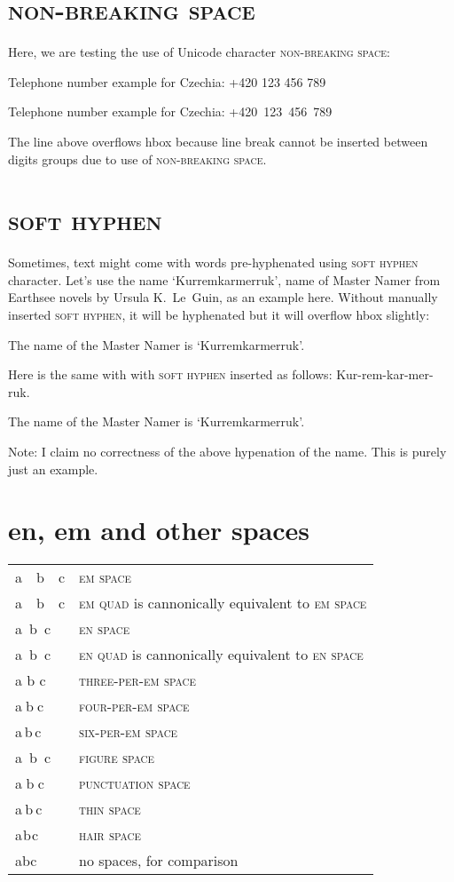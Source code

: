 \documentclass{article}
\DeclareRobustCommand{\expl}[1]{{\sffamily #1}}
\newcommand{\nbsp}{\textsc{non-breaking space}}
\newcommand{\shy}{\textsc{soft hyphen}}
\newcommand{\enquad}{\textsc{en quad}}
\newcommand{\enspaceC}{\textsc{en space}}
\newcommand{\emquad}{\textsc{em quad}}
\newcommand{\emspaceC}{\textsc{em space}}
\newcommand{\threePerEm}{\textsc{three-per-em space}}
\newcommand{\fourPerEm}{\textsc{four-per-em space}}
\newcommand{\sixPerEm}{\textsc{six-per-em space}}
\newcommand{\figuresp}{\textsc{figure space}}
\newcommand{\punctsp}{\textsc{punctuation space}}
\newcommand{\thinsp}{\textsc{thin space}}
\newcommand{\hairsp}{\textsc{hair space}}
\begin{document}
\pagebreak

\section{\nbsp{}}

\expl{Here, we are testing the use of Unicode character \nbsp{}:}

Telephone number example for Czechia: +420 123 456 789

Telephone number example for Czechia: +420 123 456 789

\expl{The line above overflows hbox because line break cannot be inserted
  between digits groups due to use of \nbsp{}.}

\pagebreak

\section{\shy{}}
\expl{Sometimes, text might come with words pre-​hyphenated using \shy{}
  character. Let's use the name `Kurremkarmerruk', name of Master Namer from
  Earthsee novels by Ursula K.\ Le~Guin, as an example here. Without manually
  inserted \shy{}, it will be hyphenated but it will overflow hbox slightly:}

The name of the Master Namer is `Kurremkarmerruk'.

\expl{Here is the same with with \shy{} inserted as follows:
  Kur-rem-kar-mer-ruk.}

The name of the Master Namer is `Kur­rem­kar­mer­ruk'.

\expl{Note: I claim no correctness of the above hypenation of the name. This
  is purely just an example.}

\pagebreak

\section{en, em and other spaces}

\begin{tabular}[c]{l | p{}}
  a b c & \expl{\emspaceC{}}\tabularnewline
  a b c & \expl{\emquad{} is cannonically equivalent to \emspaceC{}}\tabularnewline
  a b c & \expl{\enspaceC{}}\tabularnewline
  a b c & \expl{\enquad{} is cannonically equivalent to \enspaceC{}}\tabularnewline
  a b c & \expl{\threePerEm{}}\tabularnewline
  a b c & \expl{\fourPerEm{}}\tabularnewline
  a b c & \expl{\sixPerEm{}}\tabularnewline
  a b c & \expl{\figuresp{}}\tabularnewline
  a b c & \expl{\punctsp{}}\tabularnewline
  a b c & \expl{\thinsp{}}\tabularnewline
  a b c & \expl{\hairsp{}}\tabularnewline
  abc   & \expl{no spaces, for comparison}\tabularnewline
\end{tabular}
\end{document}
